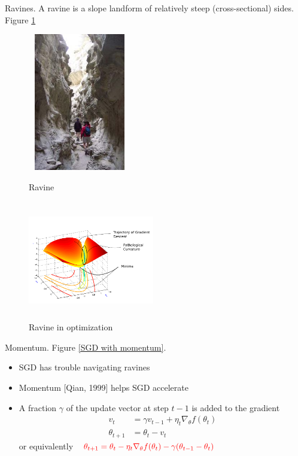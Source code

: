 \documentclass[english]{article}
\begin{document}

\item {Ravines}.
A ravine is a slope landform of relatively steep (cross-sectional) sides. Figure \ref{Ravine}

\begin{figure}
\centering
\begin{minipage}{.5\textwidth}
  \centering
  \includegraphics[width=4.5cm, height=6cm]{ravine_wiki.jpg}
  \caption{Ravine}
  \label{Ravine}
\end{minipage}%
\begin{minipage}{.5\textwidth}
  \centering
  \includegraphics[width=5.5cm, height=5.2cm]{ravine_sgd.png}
  \caption{Ravine in optimization}
\end{minipage}
\end{figure}










\item {Momentum}. Figure \ref{SGD with momentum}.
\begin{itemize}
\item SGD has trouble navigating ravines
\item Momentum [Qian, 1999] helps SGD accelerate
\item A fraction $\gamma$ of the update vector at step $t-1$ is added to the gradient
\begin{align*}
v_{t} &= \gamma v_{t-1} + \eta_t \nabla_\theta f(\theta_t)  \\
\theta_{t+1} &= \theta_t - v_t
\end{align*}
or equivalently $\ \ \textcolor{red}{\theta_{t+1} = \theta_t - \eta_t \nabla_\theta f(\theta_t) -\gamma (\theta_{t-1}-\theta_t)}$
\end{itemize}
\end{document}
